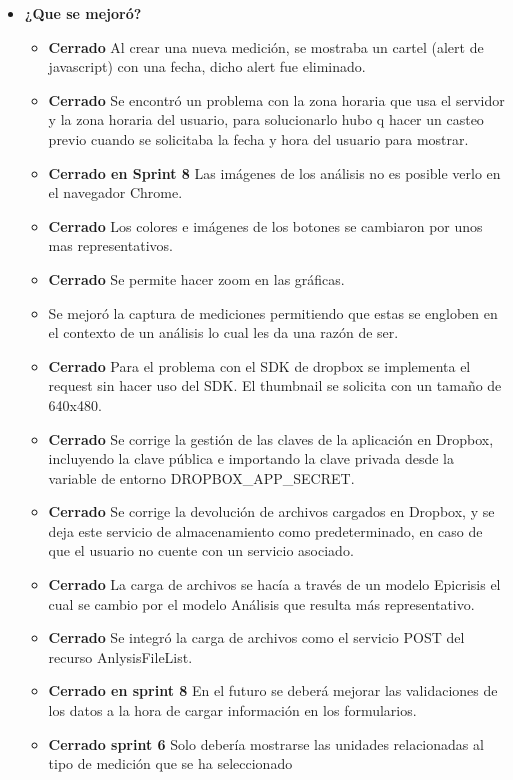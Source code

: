 \begin{itemize}
 		\item \textbf{¿Que se mejoró?}
 		\begin{itemize}
 			\item \textbf{Cerrado} Al crear una nueva medición, se mostraba un cartel (alert de javascript) con una fecha, dicho alert fue eliminado.
 			\item \textbf{Cerrado} Se encontró un problema con la zona horaria que usa el servidor y la zona horaria del usuario, para solucionarlo hubo q hacer un casteo previo cuando se solicitaba la fecha y hora del usuario para mostrar.
			\item \textbf{Cerrado en Sprint 8} Las imágenes de los análisis no es posible verlo en el navegador Chrome.
			\item \textbf{Cerrado} Los colores e imágenes de los botones se cambiaron por unos mas representativos.
			\item \textbf{Cerrado} Se permite hacer zoom en las gráficas.
			\item Se mejoró la captura de mediciones permitiendo que estas se engloben en el contexto de un análisis lo cual les da una razón de ser.
            \item \textbf{Cerrado} Para el problema con el SDK de dropbox se implementa el request sin hacer uso del SDK. El thumbnail se solicita con un tamaño de 640x480.
            \item \textbf{Cerrado} Se corrige la gestión de las claves de la aplicación en Dropbox, incluyendo la clave pública e importando la clave privada desde la variable de entorno DROPBOX\_APP\_SECRET.
            \item \textbf{Cerrado} Se corrige la devolución de archivos cargados en Dropbox, y se deja este servicio de almacenamiento como predeterminado, en caso de que el usuario no cuente con un servicio asociado.
            \item \textbf{Cerrado} La carga de archivos se hacía a través de un modelo Epicrisis el cual se cambio por el modelo Análisis que resulta más representativo.
            \item \textbf{Cerrado} Se integró la carga de archivos como el servicio POST del recurso AnlysisFileList.	
			\item \textbf{Cerrado en sprint 8} En el futuro se deberá mejorar las validaciones de los datos a la hora de cargar información en los formularios.   
 			\item \textbf{Cerrado sprint 6} Solo debería mostrarse las unidades relacionadas al tipo de medición que se ha seleccionado	

\end{itemize}
\end{itemize}
